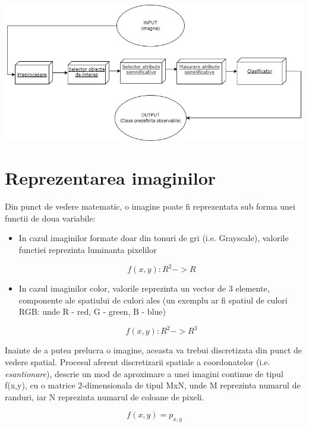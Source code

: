 \documentclass[10pt]{article}
\begin{document}
\includegraphics[scale=0.5]{componente}


\newpage

\section{Reprezentarea imaginilor}\label{sec:3}

\> Din punct de vedere matematic, o imagine poate fi reprezentata sub forma unei
functii de doua variabile:

\begin{itemize}
	\item In cazul imaginilor formate doar din tonuri de gri (i.e. Grayscale),
	valorile functiei reprezinta luminanta pixelilor
	
	\begin{equation}\label{eq:1}
		f(x,y) : R^2 -> R
	\end{equation}

	\item In cazul imaginilor color, valorile reprezinta un vector de 3 elemente,
componente ale spatiului de culori ales (un exemplu ar fi spatiul de culori RGB:
unde R - red, G - green, B - blue)

	\begin{equation}\label{eq:2}
		f(x,y) : R^2 -> R^3
	\end{equation}

\end{itemize}

\> Inainte de a putea prelucra o imagine, aceasta va trebui discretizata din punct
de vedere spatial. Procesul aferent discretizarii spatiale a
coordonatelor (i.e. {\it esantionare}), descrie un mod de aproximare a unei imagini continue
de tipul f(x,y), cu o matrice 2-dimensionala de tipul MxN, unde M reprezinta numarul de randuri,
iar N reprezinta numarul de coloane de pixeli.

\begin{equation}\label{eq:3}
	f(x,y) = p_{x,y}
\end{equation}
\end{document}

